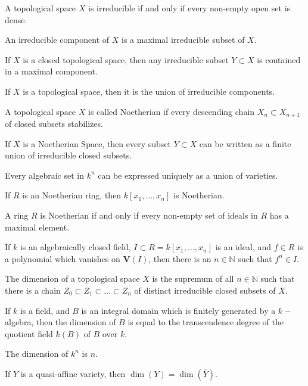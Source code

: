 \documentclass[crop=false,class=book]{standalone}
\begin{document}
\begin{theorem}
A topological space $X$ is irreducible if and only if every non-empty open set is dense.
\end{theorem}
\begin{definition}
An irreducible component of $X$ is a maximal irreducible subset of $X$.
\end{definition}
\begin{theorem}
If $X$ is a closed topological space, then any irreducible subset $Y\subset X$ is contained in a maximal component.
\end{theorem}
\begin{theorem}
If $X$ is a topological space, then it is the union of irreducible components.
\end{theorem}
\begin{definition}
A topological space $X$ is called Noetherian if every descending chain $X_n \subset X_{n+1}$ of closed subsets stabilizes.
\end{definition}
\begin{theorem}
If $X$ is a Noetherian Space, then every subset $Y\subset X$ can be written as a finite union of irreducible closed subsets.
\end{theorem}
\begin{theorem}
Every algebraic set in $k^n$ can be expressed uniquely as a union of varieties.
\end{theorem}
\begin{theorem}
If $R$ is an Noetherian ring, then $k[x_1,\hdots ,x_n]$ is Noetherian.
\end{theorem}
\begin{theorem}
A ring $R$ is Noetherian if and only if every non-empty set of ideals in $R$ has a maximal element.
\end{theorem}
\begin{theorem}
If $k$ is an algebraically closed field, $I\subset R = k[x_1,\hdots ,x_n]$ is an ideal, and $f\in R$ is a polynomial which vanishes on $\mathbf{V}(I)$, then there is an $n\in \mathbb{N}$ such that $f^n \in I$.
\end{theorem}
\begin{definition}
The dimension of a topological space $X$ is the supremum of all $n\in \mathbb{N}$ such that there is a chain $Z_0\subset Z_1\subset \hdots \subset Z_n$ of distinct irreducible closed subsets of $X$.
\end{definition}
\begin{theorem}
If $k$ is a field, and $B$ is an integral domain which is finitely generated by a $k-$algebra, then the dimension of $B$ is equal to the transcendence degree of the quotient field $k(B)$ of $B$ over $k$.
\end{theorem}
\begin{theorem}
The dimension of $k^n$ is $n$.
\end{theorem}
\begin{theorem}
If $Y$ is a quasi-affine variety, then $\dim(Y) = \dim(\overline{Y})$.
\end{theorem}
\end{document}
